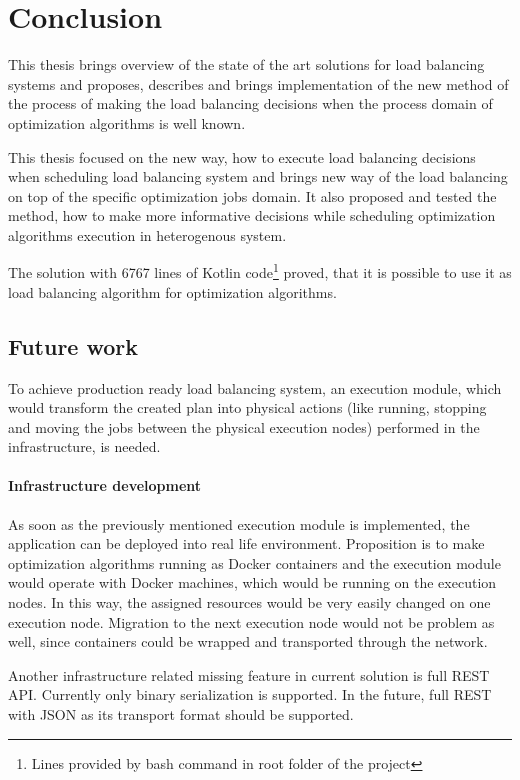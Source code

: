 \chapter{Conclusion}\label{ch:conclusion}
This thesis brings overview of the state of the art solutions for load balancing systems
and proposes, describes and brings implementation of the new method 
of the process of making the load balancing decisions when the process domain of optimization algorithms is well known. 


This thesis focused on the new way,
how to execute load balancing decisions when scheduling  load balancing system
and brings new way of the load balancing on top of the specific optimization jobs domain.
It also proposed and tested the method,
how to make more informative decisions while scheduling optimization algorithms execution in heterogenous system.

The solution with 6767 lines of Kotlin 
code\footnote{Lines provided by  bash command in root folder of the project} 
proved, that it is possible to use it as load balancing algorithm for optimization algorithms.

\section{Future work}\label{sec:future-work}
To achieve production ready load balancing system, 
an execution module, 
which would transform the created plan into physical actions 
(like running, stopping and moving the jobs between the physical execution nodes)
performed in the infrastructure,
is needed.

\subsubsection{Infrastructure development}
As soon as the previously mentioned execution module is implemented,
the application can be deployed into real life environment.
Proposition is to make optimization algorithms running as Docker containers 
and the execution module would operate with Docker machines,
which would be running on the execution nodes. 
In this way, 
the assigned resources would be very easily changed on one execution node.
Migration to the next execution node would not be problem as well, 
since containers could be wrapped and transported through the network.

Another infrastructure related missing feature in current solution is full REST API.
Currently only binary serialization is supported.
In the future, 
full REST with JSON as its transport format should be supported.

